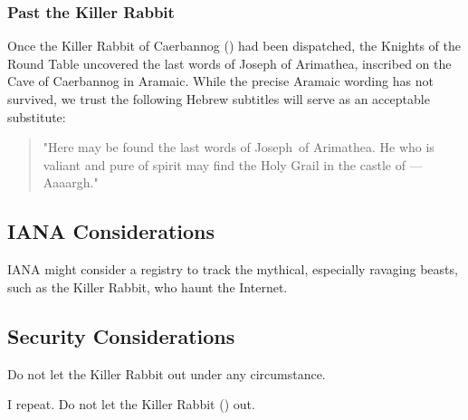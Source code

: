 \documentclass{metanorma}
\begin{document}
\subsubsection{Past the Killer Rabbit}

Once the Killer Rabbit of Caerbannog () had been
dispatched, the Knights of the Round Table uncovered the last
words of Joseph of Arimathea, inscribed on the Cave of Caerbannog
in Aramaic.  While the precise Aramaic wording has not survived,
we trust the following Hebrew subtitles will serve as an
acceptable substitute:


\begin{quote}

"Here may be found the last words of Joseph~of Arimathea.
He who is valiant and pure of spirit may find the Holy Grail
in the castle of --- Aaaargh."
\end{quote}



\subsection{IANA Considerations}

IANA might consider a registry to track the mythical, especially
ravaging beasts, such as the Killer Rabbit, who haunt the Internet.


\subsection{Security Considerations}

Do not let the Killer Rabbit out under any circumstance.

I repeat. Do not let the Killer Rabbit () out.



\begin{thebibliography}{1}
\end{thebibliography}
\end{document}
